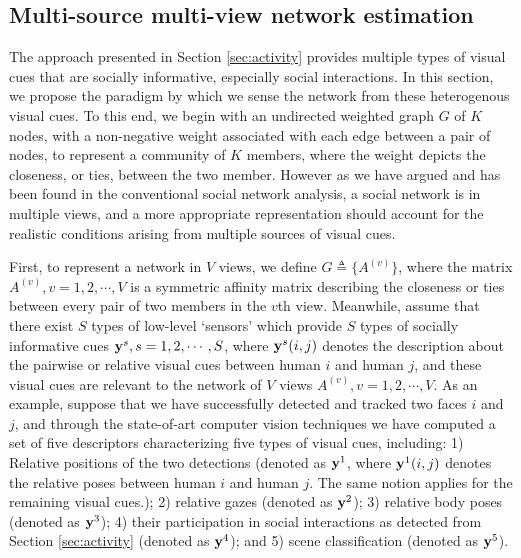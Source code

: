 \subsection{Multi-source multi-view network estimation}
\label{sec:vis2net}

The approach presented in Section \ref{sec:activity} provides multiple types of visual cues that are socially informative, especially social interactions. In this section, we propose the paradigm by which we sense the network from these heterogenous visual cues. To this end, we begin with an undirected weighted graph $G$ of $K$ nodes, with a non-negative weight associated with each edge between a pair of nodes, to represent a community of $K$ members, where the weight depicts the closeness, or ties, between the two member. However as we have argued and has been found in the conventional social network analysis, a social network is in multiple views, and a more appropriate representation should account for the realistic conditions arising from multiple sources of visual cues. 

First, to represent a network in $V$ views, we define $G\triangleq\{A^{(v)}\}$, where the matrix $A^{(v)}, v=1,2,\cdots,V$ is a symmetric affinity matrix describing the closeness or ties between every pair of two members in the $v$th view. Meanwhile, assume that there exist $S$ types of low-level `sensors' which provide $S$ types of socially informative cues ${\bf y}^s, s=1,2,\cdots,S$, where ${\bf y}^s(i,j)$ denotes the description about the pairwise or relative visual cues between human $i$ and human $j$, and these visual cues are relevant to the network of $V$ views $A^{(v)}, v=1,2,\cdots,V$.  As an example, suppose that we have successfully detected and tracked two faces $i$ and $j$, and through the state-of-art computer vision techniques we have computed a set of five descriptors characterizing five types of visual cues, including: 1) Relative positions of the two detections (denoted as ${\bf y}^1$, where ${\bf y}^1(i,j)$ denotes the relative poses between human $i$ and human $j$. The same notion applies for the remaining visual cues.); 2) relative gazes (denoted as ${\bf y}^2$); 3) relative body poses (denoted as ${\bf y}^3$); 4) their participation in social interactions as detected from Section \ref{sec:activity} (denoted as ${\bf y}^4$); and 5) scene classification (denoted as ${\bf y}^5$).

